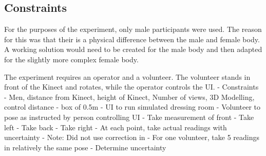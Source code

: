 \subsection{Constraints}
For the purposes of the experiment, only male participants were used. The reason for this was that their is a physical difference between the male and female body. A working solution would need to be created for the male body and then adapted for the slightly more complex female body.

The experiment requires an operator and a volunteer. The volunteer stands in front of the Kinect and rotates, while the operator controls the UI. 
- Constraints - Men, distance from Kinect, height of Kinect, Number of views, 3D Modelling, control distance - box of 0.5m
- UI to run simulated dressing room
- Volunteer to pose as instructed by person controlling UI
- Take measurement of front
- Take left
- Take back
- Take right 
- At each point, take actual readings with uncertainty
- Note: Did not use correction in \cite{nonContact2017}
- For one volunteer, take 5 readings in relatively the same pose - Determine uncertainty 